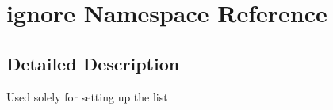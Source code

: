 \hypertarget{namespaceignore}{\section{ignore \-Namespace \-Reference}
\label{namespaceignore}
}


\subsection{\-Detailed \-Description}
\-Used solely for setting up the  list
